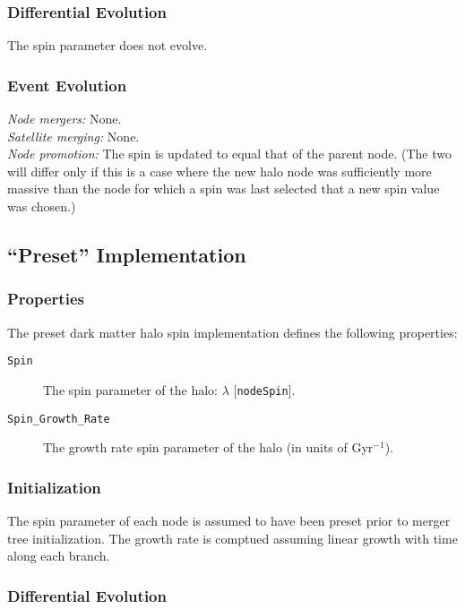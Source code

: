 \subsubsection{Differential Evolution}

The spin parameter does not evolve.

\subsubsection{Event Evolution}

\noindent\emph{Node mergers:} None.\\

\noindent\emph{Satellite merging:} None.\\

\noindent\emph{Node promotion:} The spin is updated to equal that of the parent node. (The two will differ only if this is a case where the new halo \gls{node} was sufficiently more massive than the \gls{node} for which a spin was last selected that a new spin value was chosen.)\\

\subsection{``Preset'' Implementation}

\subsubsection{Properties}

The preset dark matter halo spin implementation defines the following properties:
\begin{description}
 \item [{\tt Spin}] The spin parameter of the halo: $\lambda$ [{\tt nodeSpin}].
 \item [{\tt Spin\_Growth\_Rate}] The growth rate spin parameter of the halo (in units of Gyr$^{-1}$).
\end{description}

\subsubsection{Initialization}

The spin parameter of each \gls{node} is assumed to have been preset prior to merger tree initialization. The growth rate is comptued assuming linear growth with time along each branch.

\subsubsection{Differential Evolution}


